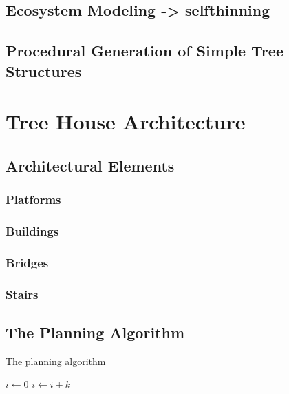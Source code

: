 \documentclass{article}
\begin{document}
\subsection{Ecosystem Modeling -> selfthinning}


\subsection{Procedural Generation of Simple Tree Structures}

\section{Tree House Architecture}

\subsection{Architectural Elements} 


\subsubsection{Platforms}

\subsubsection{Buildings}

\subsubsection{Bridges}

\subsubsection{Stairs}

\subsection{The Planning Algorithm}
 
\begin{algorithm}
\caption{The planning algorithm}
\begin{algorithmic}
        \STATE $i\gets 0$
\ELSE
                \STATE $i\gets i+k$
        \ENDIF
\ENDIF 
\end{algorithmic}

\end{algorithm}
\end{document}
